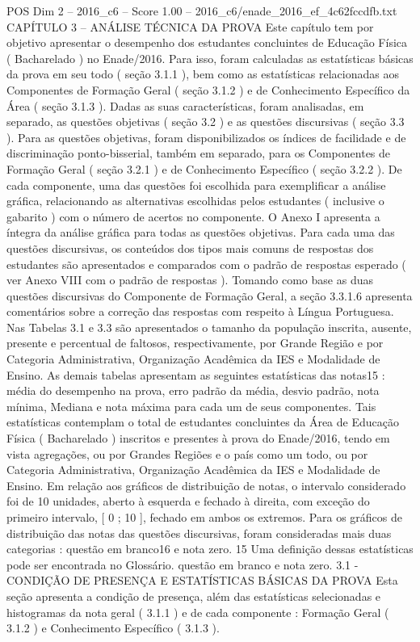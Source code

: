 \begin{textsample}{POS Dim 2 – 2016\_c6 – Score 1.00 – 2016\_c6/enade\_2016\_ef\_4c62fccdfb.txt}  \label{ex:f2_pos_207}
CAPÍTULO 3 – ANÁLISE TÉCNICA DA PROVA Este capítulo tem por objetivo apresentar o desempenho dos estudantes concluintes de Educação Física ( Bacharelado ) no Enade/2016.
Para isso, foram calculadas as estatísticas básicas da prova em seu todo ( seção 3.1.1 ), bem como as estatísticas relacionadas aos Componentes de Formação Geral ( seção 3.1.2 ) e de Conhecimento Específico da Área ( seção 3.1.3 ).
Dadas as suas características, foram analisadas, em separado, as questões objetivas ( seção 3.2 ) e as questões discursivas ( seção 3.3 ).
Para as questões objetivas, foram disponibilizados os índices de facilidade e de discriminação ponto-bisserial, também em separado, para os Componentes de Formação Geral ( seção 3.2.1 ) e de Conhecimento Específico ( seção 3.2.2 ).
De cada componente, uma das questões foi escolhida para exemplificar a análise gráfica, relacionando as alternativas escolhidas pelos estudantes ( inclusive o gabarito ) com o número de acertos no componente.
O Anexo I apresenta a íntegra da análise gráfica para todas as questões objetivas.
Para cada uma das questões discursivas, os conteúdos dos tipos mais comuns de respostas dos estudantes são apresentados e comparados com o padrão de respostas esperado ( ver Anexo VIII com o padrão de respostas ).
Tomando como base as duas questões discursivas do Componente de Formação Geral, a seção 3.3.1.6 apresenta comentários sobre a correção das respostas com respeito à Língua Portuguesa.
Nas Tabelas 3.1 e 3.3 são apresentados o tamanho da população inscrita, ausente, presente e percentual de faltosos, respectivamente, por Grande Região e por Categoria Administrativa, Organização Acadêmica da IES e Modalidade de Ensino.
As demais tabelas apresentam as seguintes estatísticas das notas15 : média do desempenho na prova, erro padrão da média, desvio padrão, nota mínima, Mediana e nota máxima para cada um de seus componentes.
Tais estatísticas contemplam o total de estudantes concluintes da Área de Educação Física ( Bacharelado ) inscritos e presentes à prova do Enade/2016, tendo em vista agregações, ou por Grandes Regiões e o país como um todo, ou por Categoria Administrativa, Organização Acadêmica da IES e Modalidade de Ensino.
Em relação aos gráficos de distribuição de notas, o intervalo considerado foi de 10 unidades, aberto à esquerda e fechado à direita, com exceção do primeiro intervalo, [ 0 ; 10 ], fechado em ambos os extremos.
Para os gráficos de distribuição das notas das questões discursivas, foram consideradas mais duas categorias : questão em branco16 e nota zero. 15 Uma definição dessas estatísticas pode ser encontrada no Glossário. questão em branco e nota zero. 3.1 - CONDIÇÃO DE PRESENÇA E ESTATÍSTICAS BÁSICAS DA PROVA Esta seção apresenta a condição de presença, além das estatísticas selecionadas e histogramas da nota geral ( 3.1.1 ) e de cada componente : Formação Geral ( 3.1.2 ) e Conhecimento Específico ( 3.1.3 ).

\end{textsample}
